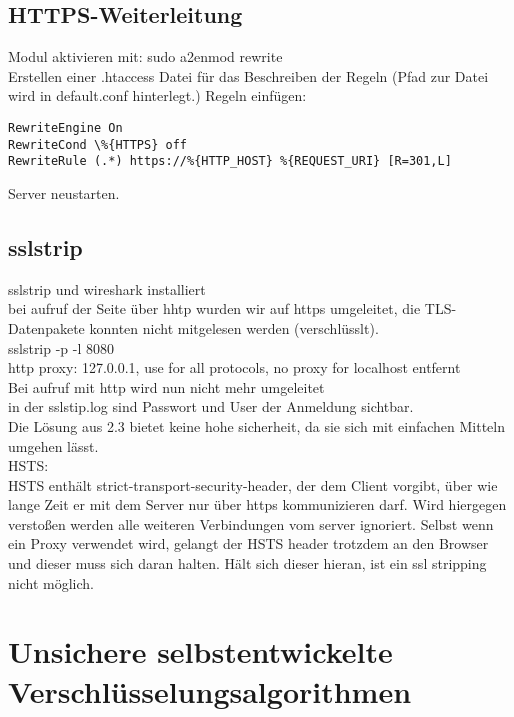 \documentclass[12pt]{article}
\theoremstyle{plain}
\begin{document}
\subsection{HTTPS-Weiterleitung}
Modul aktivieren mit: sudo a2enmod rewrite\\
Erstellen einer .htaccess Datei für das Beschreiben der Regeln (Pfad zur Datei wird in default.conf hinterlegt.) Regeln einfügen:\\
\begin{verbatim}
RewriteEngine On
RewriteCond \%{HTTPS} off
RewriteRule (.*) https://%{HTTP_HOST} %{REQUEST_URI} [R=301,L] 
\end{verbatim}
Server neustarten.
\subsection{sslstrip}
sslstrip und wireshark installiert\\
bei aufruf der Seite über hhtp wurden wir auf https umgeleitet, die TLS-Datenpakete konnten nicht mitgelesen werden (verschlüsslt).\\
sslstrip -p -l 8080\\
http proxy: 127.0.0.1, use for all protocols, no proxy for localhost entfernt\\
Bei aufruf mit http wird nun nicht mehr umgeleitet\\
in der sslstip.log sind Passwort und User der Anmeldung sichtbar.\\
Die Lösung aus 2.3 bietet keine hohe sicherheit, da sie sich mit einfachen Mitteln umgehen lässt.\\
HSTS:\\
HSTS enthält strict-transport-security-header, der dem Client vorgibt, über wie lange Zeit er mit dem Server nur über https kommunizieren darf. Wird hiergegen verstoßen werden alle weiteren Verbindungen vom server ignoriert. Selbst wenn ein Proxy verwendet wird, gelangt der HSTS header trotzdem an den Browser und dieser muss sich daran halten. Hält sich dieser hieran, ist ein ssl stripping nicht möglich.
\section{Unsichere selbstentwickelte Verschlüsselungsalgorithmen}
\end{document}
